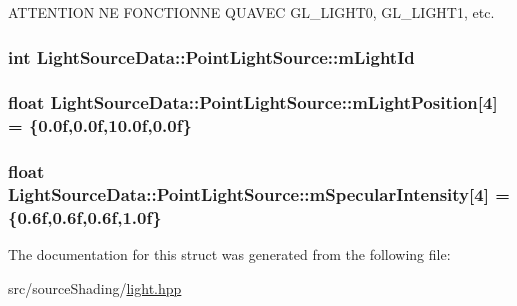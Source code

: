 A\+T\+T\+E\+N\+T\+I\+ON NE F\+O\+N\+C\+T\+I\+O\+N\+NE QU\textquotesingle{}A\+V\+EC G\+L\+\_\+\+L\+I\+G\+H\+T0, G\+L\+\_\+\+L\+I\+G\+H\+T1, etc. 

\subsubsection[{\texorpdfstring{m\+Light\+Id}{mLightId}}]{\setlength{\rightskip}{0pt plus 5cm}int Light\+Source\+Data\+::\+Point\+Light\+Source\+::m\+Light\+Id}\hypertarget{struct_light_source_data_1_1_point_light_source_af1e590645aa46ca01388ee4204f17eb7}{}\label{struct_light_source_data_1_1_point_light_source_af1e590645aa46ca01388ee4204f17eb7}
\subsubsection[{\texorpdfstring{m\+Light\+Position}{mLightPosition}}]{\setlength{\rightskip}{0pt plus 5cm}float Light\+Source\+Data\+::\+Point\+Light\+Source\+::m\+Light\+Position\mbox{[}4\mbox{]} = \{0.\+0f,0.\+0f,10.\+0f,0.\+0f\}}\hypertarget{struct_light_source_data_1_1_point_light_source_a54b8bcb5e6c8779065b39137b54e7a4a}{}\label{struct_light_source_data_1_1_point_light_source_a54b8bcb5e6c8779065b39137b54e7a4a}
\subsubsection[{\texorpdfstring{m\+Specular\+Intensity}{mSpecularIntensity}}]{\setlength{\rightskip}{0pt plus 5cm}float Light\+Source\+Data\+::\+Point\+Light\+Source\+::m\+Specular\+Intensity\mbox{[}4\mbox{]} = \{0.\+6f,0.\+6f,0.\+6f,1.\+0f\}}\hypertarget{struct_light_source_data_1_1_point_light_source_ad561b4571eac75209782dd6a5ac2cabd}{}\label{struct_light_source_data_1_1_point_light_source_ad561b4571eac75209782dd6a5ac2cabd}


The documentation for this struct was generated from the following file\+:\begin{DoxyCompactItemize}
\item 
src/source\+Shading/\hyperlink{light_8hpp}{light.\+hpp}\end{DoxyCompactItemize}
